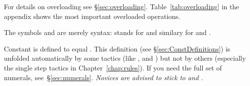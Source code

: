 \begin{isabellebody}
\begin{isamarkuptext}
\begin{warn}
  For details on overloading see \S\ref{sec:overloading}.
  Table~\ref{tab:overloading} in the appendix shows the most important
  overloaded operations.
\end{warn}
\begin{warn}
  The symbols  and
   are merely syntax: 
  stands for  and similary for  and
  .
\end{warn}
\begin{warn}
  Constant  is defined to equal . This definition
  (see \S\ref{sec:ConstDefinitions}) is unfolded automatically by some
  tactics (like ,  and ) but not by
  others (especially the single step tactics in Chapter~\ref{chap:rules}).
  If you need the full set of numerals, see~\S\ref{sec:numerals}.
  \emph{Novices are advised to stick to  and .}
\end{warn}


\end{isamarkuptext}
\end{isabellebody}
